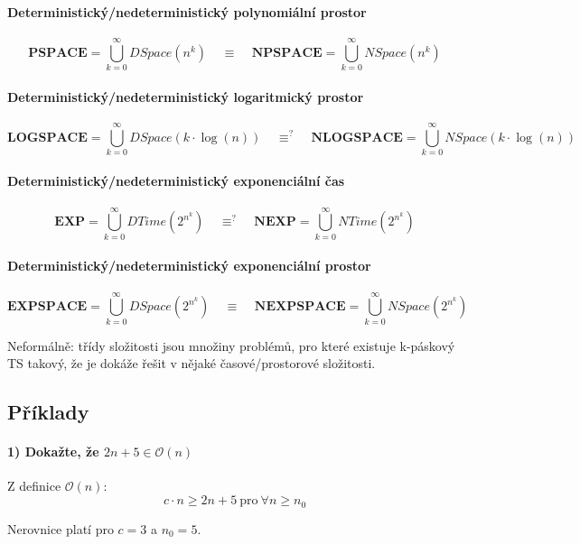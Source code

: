 \paragraph*{Deterministický/nedeterministický polynomiální prostor} $$ \mathbf{PSPACE} = \bigcup_{k=0}^{\infty} DSpace(n^k) ~~~~~ \equiv ~~~~~ \mathbf{NPSPACE} = \bigcup_{k=0}^{\infty} NSpace(n^k) $$

\paragraph*{Deterministický/nedeterministický logaritmický prostor} $$ \mathbf{LOGSPACE} = \bigcup_{k=0}^{\infty} DSpace(k \cdot \log(n)) ~~~~~ \equiv^? ~~~~~ \mathbf{NLOGSPACE} = \bigcup_{k=0}^{\infty} NSpace(k \cdot \log(n)) $$

\paragraph*{Deterministický/nedeterministický exponenciální čas} $$ \mathbf{EXP} = \bigcup_{k=0}^{\infty} DTime(2^{n^k}) ~~~~~ \equiv^? ~~~~~ \mathbf{NEXP} = \bigcup_{k=0}^{\infty} NTime(2^{n^k}) $$

\paragraph*{Deterministický/nedeterministický exponenciální prostor} $$ \mathbf{EXPSPACE} = \bigcup_{k=0}^{\infty} DSpace(2^{n^k}) ~~~~~ \equiv ~~~~~ \mathbf{NEXPSPACE} = \bigcup_{k=0}^{\infty} NSpace(2^{n^k}) $$

\medskip \noindent Neformálně: třídy složitosti jsou množiny problémů, pro které existuje k-páskový TS takový, že je dokáže řešit v nějaké časové/prostorové složitosti.

\subsection{Příklady}

\paragraph*{1) Dokažte, že $2n + 5 \in \mathcal{O}(n) $} \begin{compactitem}
    \item Z definice $\mathcal{O}(n)$: $$ c \cdot n \geq 2n + 5 ~\text{pro}~ \forall n \geq n_0 $$

    \item Nerovnice platí pro $c = 3$ a $n_0 = 5$.
\end{compactitem}

